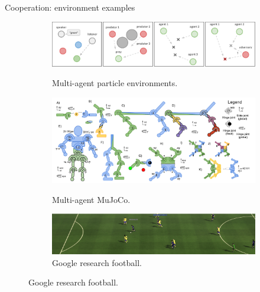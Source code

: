 \documentclass[9pt, hyperref={pdfusetitle,colorlinks=true,allcolors=DarkBlue}]{beamer}
\begin{document}
\begin{frame}{Cooperation: environment examples}
\begin{figure}
\begin{subfigure}[b]{0.66\textwidth}
        \includegraphics[width=.95\textwidth]{MPE_task.pdf}
        \caption{Multi-agent particle environments.}
        \includegraphics[width=.97\textwidth]{mamujoco_manyagent.pdf}
        \caption{Multi-agent MuJoCo.}
        \includegraphics[width=.95\textwidth]{google_foot_crop.png}
        \caption{Google research football.}
\end{subfigure}

\end{figure}
\end{frame}
\end{document}
